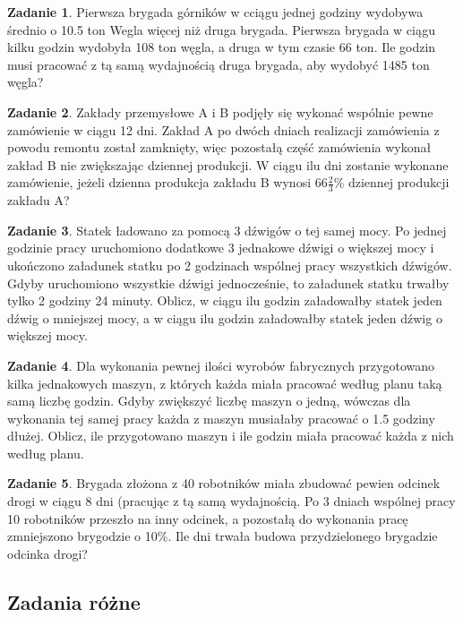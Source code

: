 \documentclass[11pt]{article}
\theoremstyle{definition}
\newtheorem{zad}{Zadanie}
\begin{document}
\begin{zad}
Pierwsza brygada górników w cciągu jednej godziny wydobywa średnio o 10.5 ton Wegla więcej niż druga brygada. Pierwsza brygada w ciągu kilku godzin wydobyła 108 ton węgla, a druga w tym czasie 66 ton. Ile godzin musi pracować z tą samą wydajnością druga brygada, aby wydobyć 1485 ton węgla?
\end{zad}

\begin{zad}
Zakłady przemysłowe A i B podjęły się wykonać wspólnie pewne zamówienie w ciągu 12 dni. Zakład A po dwóch dniach realizacji zamówienia z powodu remontu został zamknięty, więc pozostałą część zamówienia wykonał zakład B nie zwiększając dziennej produkcji. W ciągu ilu dni zostanie wykonane zamówienie, jeżeli dzienna produkcja zakładu B wynosi $66\frac23\%$ dziennej produkcji zakładu A?
\end{zad}

\begin{zad}
Statek ładowano za pomocą 3 dźwigów o tej samej mocy. Po jednej godzinie pracy uruchomiono dodatkowe 3 jednakowe dźwigi o większej mocy i ukończono załadunek statku po 2 godzinach wspólnej pracy wszystkich dźwigów. Gdyby uruchomiono wszystkie dźwigi jednocześnie, to załadunek statku trwałby tylko 2 godziny 24 minuty. Oblicz, w ciągu ilu godzin załadowałby statek jeden dźwig o mniejszej mocy, a w ciągu ilu godzin załadowałby statek jeden dźwig o większej mocy.
\end{zad}

\begin{zad}
Dla wykonania pewnej ilości wyrobów fabrycznych przygotowano kilka jednakowych maszyn, z których każda miała pracować według planu taką samą liczbę godzin. Gdyby zwiększyć liczbę maszyn o jedną, wówczas dla wykonania tej samej pracy każda z maszyn musiałaby pracować o 1.5 godziny dłużej. Oblicz, ile przygotowano maszyn i ile godzin miała pracować każda z nich według planu.
\end{zad}

\begin{zad}
Brygada złożona z 40 robotników miała zbudować pewien odcinek drogi w ciągu 8 dni (pracując z tą samą wydajnością. Po 3 dniach wspólnej pracy 10 robotników przeszło na inny odcinek, a pozostałą do wykonania pracę zmniejszono brygodzie o 10\%. Ile dni trwała budowa przydzielonego brygadzie odcinka drogi?
\end{zad}

\subsection{Zadania różne}
\end{document}
